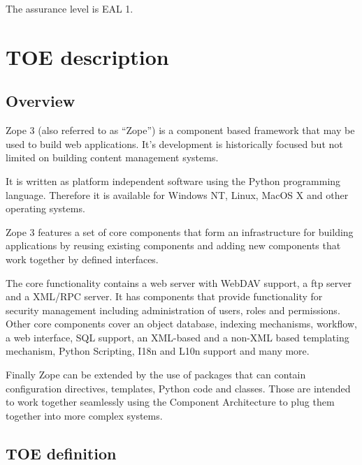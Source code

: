\documentclass[10pt,a4paper,english]{article}
\begin{document}
The assurance level is EAL 1.



\hypertarget{toe-description}{}
\section*{TOE description}



\hypertarget{overview}{}
\subsection*{Overview}

Zope 3 (also referred to as ``Zope'') is a component based framework that may be
used to build web applications. It's development is historically focused but
not limited on building content management systems.

It is written as platform independent software using the Python programming
language. Therefore it is available for Windows NT, Linux, MacOS X and other
operating systems.

Zope 3 features a set of core components that form an infrastructure for 
building applications by reusing existing components and adding new components
that work together by defined interfaces.

The core functionality contains a web server with WebDAV support, a ftp server
and a XML/RPC server.  It has components that provide functionality for
security management including administration of users, roles and permissions.
Other core components cover an object database, indexing mechanisms,
workflow, a web interface, SQL support, an XML-based and a non-XML based templating
mechanism, Python Scripting, I18n and L10n support and many more.

Finally Zope can be extended by the use of packages that can contain
configuration directives, templates, Python code and classes. Those are
intended to work together seamlessly using the Component Architecture to plug
them together into more complex systems.



\hypertarget{toe-definition}{}
\subsection*{TOE definition}
\end{document}

